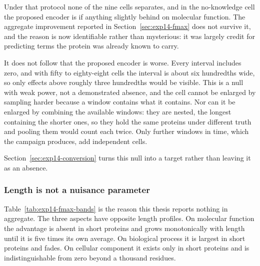 \begin{table}[htbp]
  \centering
  \caption{Maximum F-measure on the window's own ground truth, by knowledge category
  and aspect, with the prior-knowledge exclusion applied. Intervals are paired
  bootstrap draws with the measure recomputed on each. No cell separates.}
  \label{tab:exp14-category}
  
\end{table}

Under that protocol none of the nine cells separates, and in the no-knowledge cell the
proposed encoder is if anything slightly behind on molecular function. The aggregate
improvement reported in Section~\ref{sec:exp14-fmax} does not survive it, and the
reason is now identifiable rather than mysterious: it was largely credit for
predicting terms the protein was already known to carry.

It does not follow that the proposed encoder is worse. Every interval includes zero,
and with fifty to eighty-eight cells the interval is about six hundredths wide, so only
effects above roughly three hundredths would be visible. This is a null with weak
power, not a demonstrated absence, and the cell cannot be enlarged by sampling harder
because a window contains what it contains. Nor can it be enlarged by combining the
available windows: they are nested, the longest containing the shorter ones, so they
hold the same proteins under different truth and pooling them would count each twice.
Only further windows in time, which the campaign produces, add independent cells.

Section~\ref{sec:exp14-conversion} turns this null into a target rather than leaving
it as an absence.

\subsubsection{Length is not a nuisance parameter}

\begin{table}[htbp]
  \centering
  \caption{Change in maximum F-measure against the deployed encoder, by protein
  length in residues. $^{*}$~the 95\,\% interval excludes zero.}
  \label{tab:exp14-fmax-bands}
  
\end{table}

Table~\ref{tab:exp14-fmax-bands} is the reason this thesis reports nothing in
aggregate. The three aspects have opposite length profiles. On molecular function the
advantage is absent in short proteins and grows monotonically with length until it is
five times its own average. On biological process it is largest in short proteins and
fades. On cellular component it exists only in short proteins and is indistinguishable
from zero beyond a thousand residues.

